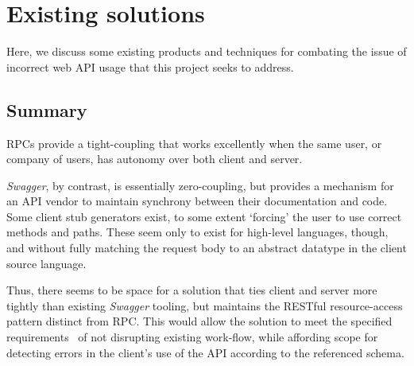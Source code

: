 \section{Existing solutions} \label{soln}

Here, we discuss some existing products and techniques for combating the issue of incorrect web API usage that this project seeks to address.






\subsection{Summary} \label{soln:summary}
RPCs provide a tight-coupling that works excellently when the same user, or company of users, has autonomy over both client and server. \cite{client_server_coupling}

\emph{Swagger}, by contrast, is essentially zero-coupling, but provides a mechanism for an API vendor to maintain synchrony between their documentation and code. Some client stub generators exist, to some extent `forcing' the user to use correct methods and paths. These seem only to exist for high-level languages, though, and without fully matching the request body to an abstract datatype in the client source language. \cite{swagger_oss}

Thus, there seems to be space for a solution that ties client and server more tightly than existing \emph{Swagger} tooling, but maintains the RESTful resource-access pattern distinct from RPC. This would allow the solution to meet the specified requirements~ of not disrupting existing work-flow, while affording scope for detecting errors in the client's use of the API according to the referenced schema.
